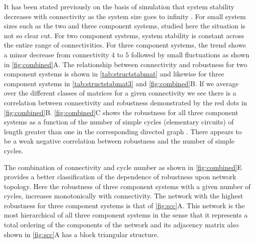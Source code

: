 It has been stated previously on the basis of simulation that system stability decreases with connectivity as the system size goes to infinity \cite{May1972}. For small system sizes such as the two and three component systems, studied here the situation is not so clear cut. For two component systems, system stability is constant across the entire range of connectivities. For three component systems, the trend shows a minor decrease from connectivity $4$ to $5$ followed by small fluctuations as shown in \ref{fig:combined}A.
The relationship between connectivity and robustness for two component systems is shown in \ref{tab:structstabmat} and likewise for three component systems in \ref{tab:structstabmat3} and \ref{fig:combined}B. If we average over the different classes of matrices for a given connectivity we see there is a correlation between connectivity and robustness demonstrated by the red dots in \ref{fig:combined}B.
\ref{fig:combined}C shows the robustness for all three component systems as a function of the number of simple cycles (elementary circuits) of length greater than one in the corresponding directed graph \cite{Johnson1975}. There appears to be a weak negative correlation between robustness and the number of simple cycles.

The combination of connectivity and cycle number as shown in \ref{fig:combined}E provides a better classification of the dependence of robustness upon network topology. Here the robustness of three component systems with a given number of cycles, increases monotonically with connectivity. The network with the highest robustness for three component systems is that of \ref{fig:scc}A. This network is the most hierarchical of all three component systems in the sense that it represents a total ordering of the components of the network and its adjacency matrix also shown in \ref{fig:scc}A has a block triangular structure.



